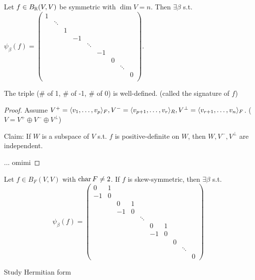 \begin{theorem}
  Let $f \in B_{\mathbb{R}}(V, V)$ be symmetric with $\dim V = n$. Then $\exists \beta$
  s.t. $\psi_\beta(f) = \begin{pmatrix}
    1 \\
    & \ddots \\
    & & 1 \\
    & & & -1 \\
    & & & & \ddots \\
    & & & & & -1 \\
    & & & & & & 0 \\
    & & & & & & & \ddots \\
    & & & & & & & & 0 \\
  \end{pmatrix}$.

  The triple (\# of 1, \# of -1, \# of 0) is well-defined.
  (called the signature of $f$)
  \begin{proof}


    Assume $V^+ = \langle v_1, \dots, v_p\rangle_F, V^- = \langle v_{p+1}, \dots, v_{r}\rangle_R,
    V^\perp = \langle v_{r+1}, \dots, v_n\rangle_F$. ($V = V^+ \oplus V^- \oplus V^\perp$)

    Claim: If $W$ is a subspace of $V$ s.t. $f$ is positive-definite on $W$,
    then $W, V^-, V^\perp$ are independent.

    ... omimi
  \end{proof}
\end{theorem}

\begin{exercise}
  Let $f \in B_F(V, V)$ with $\operatorname{char} F \ne 2$.
  If $f$ is skew-symmetric, then $\exists \beta$ s.t.
  \[
    \psi_\beta(f) = \begin{pmatrix}
      0 & 1 \\
      -1 & 0 \\
      & & 0 & 1 \\
      & & -1 & 0 \\
      & & & & \ddots \\
      & & & & & 0 & 1 \\
      & & & & & -1 & 0 \\
      & & & & & & & 0 \\
      & & & & & & & & \ddots \\
      & & & & & & & & & 0
    \end{pmatrix}
  \]
\end{exercise}

\begin{exercise}
  Study Hermitian form
\end{exercise}

